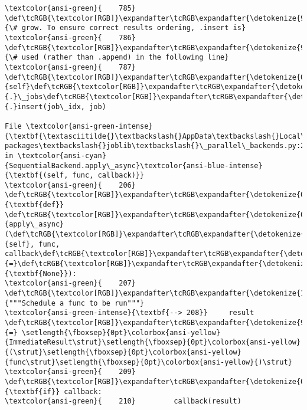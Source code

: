 \documentclass[11pt]{article}
\begin{document}
\begin{Verbatim}[commandchars=\\\{\}, frame=single, framerule=2mm, rulecolor=\color{outerrorbackground}]
\textcolor{ansi-green}{    785}     \def\tcRGB{\textcolor[RGB]}\expandafter\tcRGB\expandafter{\detokenize{95,135,135}}{\# grow. To ensure correct results ordering, .insert is}
\textcolor{ansi-green}{    786}     \def\tcRGB{\textcolor[RGB]}\expandafter\tcRGB\expandafter{\detokenize{95,135,135}}{\# used (rather than .append) in the following line}
\textcolor{ansi-green}{    787}     \def\tcRGB{\textcolor[RGB]}\expandafter\tcRGB\expandafter{\detokenize{0,135,0}}{self}\def\tcRGB{\textcolor[RGB]}\expandafter\tcRGB\expandafter{\detokenize{98,98,98}}{.}\_jobs\def\tcRGB{\textcolor[RGB]}\expandafter\tcRGB\expandafter{\detokenize{98,98,98}}{.}insert(job\_idx, job)

File \textcolor{ansi-green-intense}{\textbf{\textasciitilde{}\textbackslash{}AppData\textbackslash{}Local\textbackslash{}anaconda3\textbackslash{}lib\textbackslash{}site-packages\textbackslash{}joblib\textbackslash{}\_parallel\_backends.py:208}}, in \textcolor{ansi-cyan}{SequentialBackend.apply\_async}\textcolor{ansi-blue-intense}{\textbf{(self, func, callback)}}
\textcolor{ansi-green}{    206} \def\tcRGB{\textcolor[RGB]}\expandafter\tcRGB\expandafter{\detokenize{0,135,0}}{\textbf{def}} \def\tcRGB{\textcolor[RGB]}\expandafter\tcRGB\expandafter{\detokenize{0,0,255}}{apply\_async}(\def\tcRGB{\textcolor[RGB]}\expandafter\tcRGB\expandafter{\detokenize{0,135,0}}{self}, func, callback\def\tcRGB{\textcolor[RGB]}\expandafter\tcRGB\expandafter{\detokenize{98,98,98}}{=}\def\tcRGB{\textcolor[RGB]}\expandafter\tcRGB\expandafter{\detokenize{0,135,0}}{\textbf{None}}):
\textcolor{ansi-green}{    207}     \def\tcRGB{\textcolor[RGB]}\expandafter\tcRGB\expandafter{\detokenize{175,0,0}}{"""Schedule a func to be run"""}
\textcolor{ansi-green-intense}{\textbf{--> 208}}     result \def\tcRGB{\textcolor[RGB]}\expandafter\tcRGB\expandafter{\detokenize{98,98,98}}{=} \setlength{\fboxsep}{0pt}\colorbox{ansi-yellow}{ImmediateResult\strut}\setlength{\fboxsep}{0pt}\colorbox{ansi-yellow}{(\strut}\setlength{\fboxsep}{0pt}\colorbox{ansi-yellow}{func\strut}\setlength{\fboxsep}{0pt}\colorbox{ansi-yellow}{)\strut}
\textcolor{ansi-green}{    209}     \def\tcRGB{\textcolor[RGB]}\expandafter\tcRGB\expandafter{\detokenize{0,135,0}}{\textbf{if}} callback:
\textcolor{ansi-green}{    210}         callback(result)


\end{Verbatim}
\end{document}
